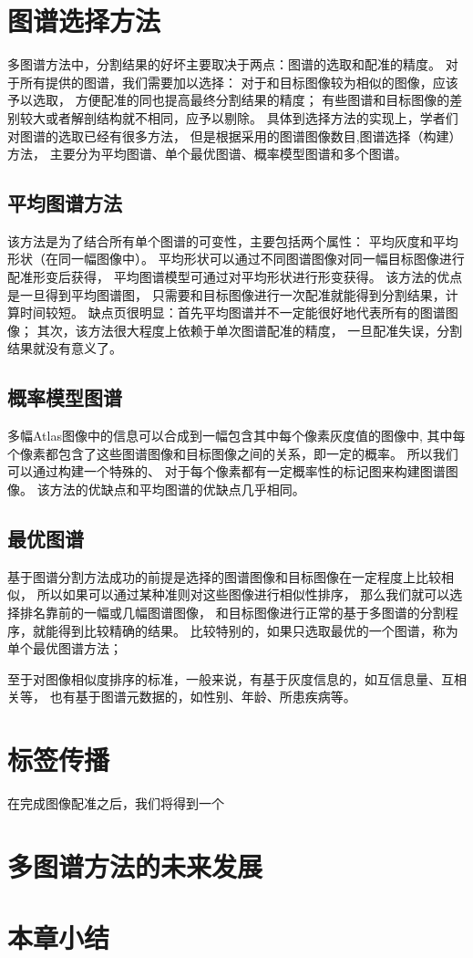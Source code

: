 



\section{图谱选择方法}%
多图谱方法中，分割结果的好坏主要取决于两点：图谱的选取和配准的精度。
对于所有提供的图谱，我们需要加以选择：
对于和目标图像较为相似的图像，应该予以选取，
方便配准的同也提高最终分割结果的精度；
有些图谱和目标图像的差别较大或者解剖结构就不相同，应予以剔除。
具体到选择方法的实现上，学者们对图谱的选取已经有很多方法，
但是根据采用的图谱图像数目,图谱选择（构建）方法，
主要分为平均图谱、单个最优图谱、概率模型图谱和多个图谱。

\subsection{平均图谱方法}
该方法是为了结合所有单个图谱的可变性，主要包括两个属性：
平均灰度和平均形状（在同一幅图像中）。
平均形状可以通过不同图谱图像对同一幅目标图像进行配准形变后获得，
平均图谱模型可通过对平均形状进行形变获得。
该方法的优点是一旦得到平均图谱图，
只需要和目标图像进行一次配准就能得到分割结果，计算时间较短。
缺点页很明显：首先平均图谱并不一定能很好地代表所有的图谱图像；
其次，该方法很大程度上依赖于单次图谱配准的精度，
一旦配准失误，分割结果就没有意义了。

\subsection{概率模型图谱}
多幅Atlas图像中的信息可以合成到一幅包含其中每个像素灰度值的图像中,
其中每个像素都包含了这些图谱图像和目标图像之间的关系，即一定的概率。
所以我们可以通过构建一个特殊的、
对于每个像素都有一定概率性的标记图来构建图谱图像。
该方法的优缺点和平均图谱的优缺点几乎相同。

\subsection{最优图谱}
基于图谱分割方法成功的前提是选择的图谱图像和目标图像在一定程度上比较相似，
所以如果可以通过某种准则对这些图像进行相似性排序，
那么我们就可以选择排名靠前的一幅或几幅图谱图像，
和目标图像进行正常的基于多图谱的分割程序，就能得到比较精确的结果。
比较特别的，如果只选取最优的一个图谱，称为单个最优图谱方法；

至于对图像相似度排序的标准，一般来说，有基于灰度信息的，如互信息量、互相关等，
也有基于图谱元数据的，如性别、年龄、所患疾病等。

\section{标签传播}
在完成图像配准之后，我们将得到一个




\section{多图谱方法的未来发展}

\section{本章小结}
